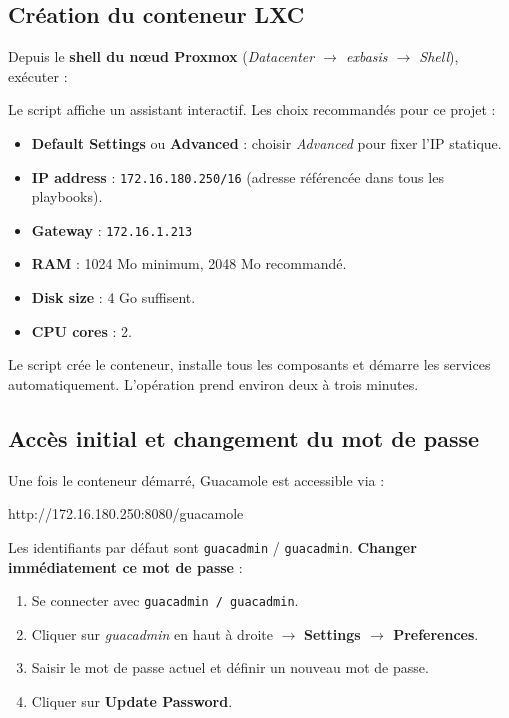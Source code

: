 \documentclass[a4paper]{article}
\newcommand{\cmd}[1]{\texttt{#1}}
\begin{document}
\subsection{Création du conteneur LXC}

Depuis le \textbf{shell du nœud Proxmox} (\textit{Datacenter \(\to\) exbasis \(\to\) Shell}), exécuter :


Le script affiche un assistant interactif. Les choix recommandés pour ce projet :

\begin{itemize}
  \item \textbf{Default Settings} ou \textbf{Advanced} : choisir \textit{Advanced} pour fixer l'IP statique.
  \item \textbf{IP address} : \cmd{172.16.180.250/16} (adresse référencée dans tous les playbooks).
  \item \textbf{Gateway} : \cmd{172.16.1.213}
  \item \textbf{RAM} : 1024 Mo minimum, 2048 Mo recommandé.
  \item \textbf{Disk size} : 4 Go suffisent.
  \item \textbf{CPU cores} : 2.
\end{itemize}

Le script crée le conteneur, installe tous les composants et démarre les services automatiquement. L'opération prend environ deux à trois minutes.

\subsection{Accès initial et changement du mot de passe}

Une fois le conteneur démarré, Guacamole est accessible via :

\begin{bashcode}
http://172.16.180.250:8080/guacamole
\end{bashcode}

Les identifiants par défaut sont \cmd{guacadmin} / \cmd{guacadmin}. \textbf{Changer immédiatement ce mot de passe} :

\begin{enumerate}
  \item Se connecter avec \cmd{guacadmin / guacadmin}.
  \item Cliquer sur \textit{guacadmin} en haut à droite \(\to\) \textbf{Settings \(\to\) Preferences}.
  \item Saisir le mot de passe actuel et définir un nouveau mot de passe.
  \item Cliquer sur \textbf{Update Password}.
\end{enumerate}
\end{document}
